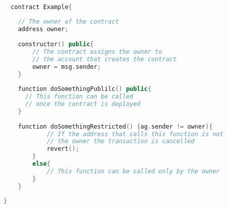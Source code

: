 \begin{minipage}{\linewidth}
\begin{lstlisting}[language=C++,commentstyle=\color{olive}\ttfamily,frame=single,caption=Example
  of an smart contract,label=contrxample,captionpos=b]

  contract Example{
    
    // The owner of the contract
    address owner;
    
    constructor() public{
        // The contract assigns the owner to 
        // the account that creates the contract
        owner = msg.sender;
    }
    
    function doSomethingPublilc() public{
      // This function can be called
      // once the contract is deployed
    }
    
    function doSomethingRestricted() {ag.sender != owner){
            // If the address that calls this function is not
            // the owner the transaction is cancelled
            revert();
        }
        else{
            // This function can be called only by the owner
        }
    }
    
}
  
  \end{lstlisting}
  \end{minipage}